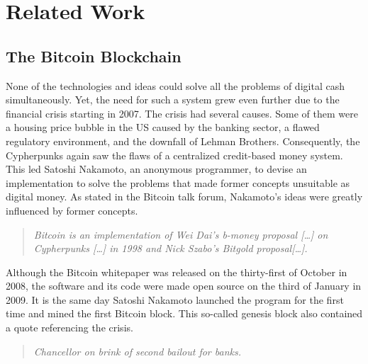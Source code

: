 \chapter{Related Work}

\section{The Bitcoin Blockchain}
None of the technologies and ideas could solve all the problems of digital cash simultaneously. 
Yet, the need for such a system grew even further due to the financial crisis starting in 2007.
The crisis had several causes. 
Some of them were a housing price bubble in the US caused by the banking sector, a flawed regulatory environment, and the downfall of Lehman Brothers. \cite{baily2009origins}
Consequently, the Cypherpunks again saw the flaws of a centralized credit-based money system.
This led Satoshi Nakamoto, an anonymous programmer, to devise an implementation to solve the problems that made former concepts
unsuitable as digital money.
As stated in the Bitcoin talk forum, Nakamoto's ideas were greatly influenced by former concepts.
\begin{quote}
    \centering 
    \textit{Bitcoin is an implementation of Wei Dai's b-money proposal […] on Cypherpunks […] in 1998 and Nick Szabo's Bitgold proposal[…].} \cite{satoshi_quote_1}
\end{quote}

Although the Bitcoin whitepaper was released on the thirty-first of October in 2008, the software and its code were made open source on the third of January in 2009.
It is the same day Satoshi Nakamoto launched the program for the first time and mined the first Bitcoin block.
This so-called genesis block also contained a quote referencing the crisis.

\begin{center}
    \begin{quote}
        \centering 
        \textit{Chancellor on brink of second bailout for banks.} \cite{editor_2009_chancellor}
    \end{quote}
\end{center}

